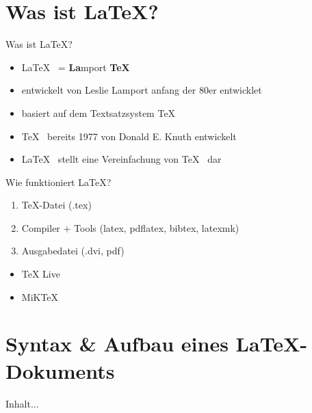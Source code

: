 
\section{Was ist \LaTeX ?}

\begin{frame}{Was ist \LaTeX ?}
	\begin{itemize}[<+->]
	\item \LaTeX \mbox{ } = \textbf{La}mport \textbf{TeX}
	\item entwickelt von Leslie Lamport anfang der 80er entwicklet
	\item basiert auf dem Textsatzsystem \TeX
	\item \TeX \mbox{ } bereits 1977 von Donald E. Knuth entwickelt
	\item \LaTeX \mbox{ } stellt eine Vereinfachung von \TeX \mbox{ } dar
	\end{itemize}
\end{frame}

\begin{frame}{Wie funktioniert \LaTeX?}
	\begin{enumerate}[<+->]
	\item \TeX -Datei (.tex)
	\item Compiler + Tools (latex, pdflatex, bibtex, latexmk)
	\item Ausgabedatei (.dvi, pdf)
	\end{enumerate}

	\begin{itemize}[<+->]
	\item TeX Live
	\item MiKTeX
	\end{itemize}
\end{frame}

\section{Syntax \& Aufbau eines \LaTeX -Dokuments}

\begin{frame}{}
Inhalt...
\end{frame}